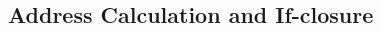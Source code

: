 \begin{scope}
\begin{minipage}{1.0\linewidth}
\begin{multicols}{2}
  \end{multicols}
  \end{minipage}
\end{scope}

\subsection{Address Calculation and If-closure}
\label{sec:semcaaddr}

